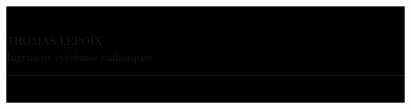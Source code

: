 \documentclass[a4paper]{article}
\begin{document}
\setlength{\fboxrule}{1.1pt}
\centering

\ \vspace{0.5cm}%

\if{}\colorbox{black}{ \fi\begin{minipage}[H]{0.75\paperwidth}
	\centering
	\if{}\rule{\textwidth}{1.1pt}\\\fi
	\if{}\vspace{0.3cm}\fi
	\if{}\color{white}\fi
	\huge THOMAS LEPOIX\\
	\LARGE Ingénieur systèmes embarqués\\
	\normalsize
	\if{}\vspace{0.3cm}\fi
	\if{}\rule{\textwidth}{1.1pt}\\\fi
	\end{minipage}\if{}} \fi

\vspace{0.5cm}%
\end{document}
